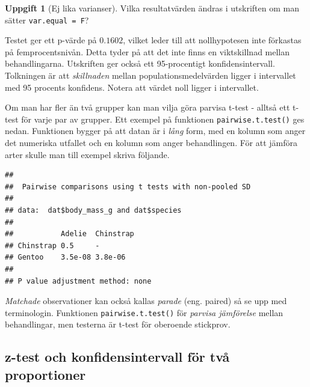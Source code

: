 \documentclass[
]{book}
\newenvironment{Shaded}{\begin{snugshade}}{\end{snugshade}}
\newcommand{\AttributeTok}[1]{\textcolor[rgb]{0.13,0.29,0.53}{#1}}
\newcommand{\FunctionTok}[1]{\textcolor[rgb]{0.13,0.29,0.53}{\textbf{#1}}}
\newcommand{\NormalTok}[1]{#1}
\newcommand{\SpecialCharTok}[1]{\textcolor[rgb]{0.81,0.36,0.00}{\textbf{#1}}}
\newcommand{\StringTok}[1]{\textcolor[rgb]{0.31,0.60,0.02}{#1}}
\newcounter{none} %
\theoremstyle{definition}
\theoremstyle{definition}
\theoremstyle{definition}
\newtheorem{exercise}{Uppgift}[chapter]
\theoremstyle{definition}
\theoremstyle{remark}
\begin{document}
\begin{exercise}[Ej lika varianser]
Vilka resultatvärden ändras i utskriften om man sätter \texttt{var.equal\ =\ F}?
\end{exercise}

Testet ger ett p-värde på \(0.1602\), vilket leder till att nollhypotesen inte förkastas på femprocentsnivån. Detta tyder på att det inte finns en viktskillnad mellan behandlingarna. Utskriften ger också ett 95-procentigt konfidensintervall. Tolkningen är att \emph{skillnaden} mellan populationsmedelvärden ligger i intervallet med 95 procents konfidens. Notera att värdet noll ligger i intervallet.

Om man har fler än två grupper kan man vilja göra parvisa t-test - alltså ett t-test för varje par av grupper.
Ett exempel på funktionen \texttt{pairwise.t.test()} ges nedan. Funktionen bygger på att datan är i \emph{lång} form, med en kolumn som anger det numeriska utfallet och en kolumn som anger behandlingen. För att jämföra arter skulle man till exempel skriva följande.

\begin{Shaded}
\end{Shaded}

\begin{verbatim}
## 
##  Pairwise comparisons using t tests with non-pooled SD 
## 
## data:  dat$body_mass_g and dat$species 
## 
##           Adelie  Chinstrap
## Chinstrap 0.5     -        
## Gentoo    3.5e-08 3.8e-06  
## 
## P value adjustment method: none
\end{verbatim}

\emph{Matchade} observationer kan också kallas \emph{parade} (eng. paired) så se upp med terminologin. Funktionen \texttt{pairwise.t.test()} för \emph{parvisa jämförelse} mellan behandlingar, men testerna är t-test för oberoende stickprov.

\subsection{z-test och konfidensintervall för två proportioner}\label{z-test-och-konfidensintervall-fuxf6r-tvuxe5-proportioner}
\end{document}
